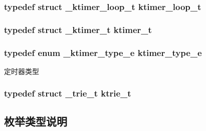 \subsubsection[{ktimer\+\_\+loop\+\_\+t}]{\setlength{\rightskip}{0pt plus 5cm}typedef struct {\bf \+\_\+ktimer\+\_\+loop\+\_\+t} {\bf ktimer\+\_\+loop\+\_\+t}}\label{a00054_a024af2aa29615e7a811ea6c45438157d_a024af2aa29615e7a811ea6c45438157d}
\hypertarget{a00054_a846172ea4e8a86449eca41a3d8e074b7_a846172ea4e8a86449eca41a3d8e074b7}{}
\subsubsection[{ktimer\+\_\+t}]{\setlength{\rightskip}{0pt plus 5cm}typedef struct {\bf \+\_\+ktimer\+\_\+t} {\bf ktimer\+\_\+t}}\label{a00054_a846172ea4e8a86449eca41a3d8e074b7_a846172ea4e8a86449eca41a3d8e074b7}
\hypertarget{a00054_a42e924130e6eb3bd995344f6d3f3e918_a42e924130e6eb3bd995344f6d3f3e918}{}
\subsubsection[{ktimer\+\_\+type\+\_\+e}]{\setlength{\rightskip}{0pt plus 5cm}typedef enum {\bf \+\_\+ktimer\+\_\+type\+\_\+e}  {\bf ktimer\+\_\+type\+\_\+e}}\label{a00054_a42e924130e6eb3bd995344f6d3f3e918_a42e924130e6eb3bd995344f6d3f3e918}
定时器类型 \hypertarget{a00054_a6b38314f31c4ed3eb36896383425a381_a6b38314f31c4ed3eb36896383425a381}{}
\subsubsection[{ktrie\+\_\+t}]{\setlength{\rightskip}{0pt plus 5cm}typedef struct {\bf \+\_\+trie\+\_\+t} {\bf ktrie\+\_\+t}}\label{a00054_a6b38314f31c4ed3eb36896383425a381_a6b38314f31c4ed3eb36896383425a381}


\subsection{枚举类型说明}
\hypertarget{a00054_a2217ac7363dbae279d056a361d122915_a2217ac7363dbae279d056a361d122915}{}

